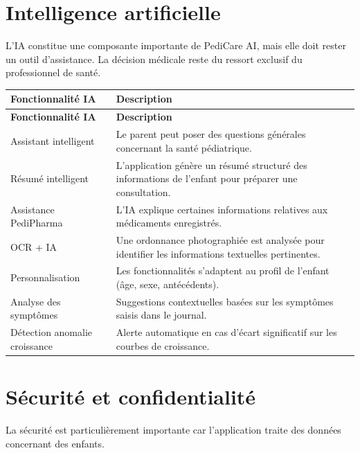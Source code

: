 \documentclass[11pt,a4paper]{article}
\newcommand{\headrow}{\rowcolor{navy}}
\newcommand{\tblhead}[1]{\color{white}\textbf{#1}}
\begin{document}
\section{Intelligence artificielle}

L'IA constitue une composante importante de PediCare AI, mais elle doit rester un outil d'assistance. La décision médicale reste du ressort exclusif du professionnel de santé.

\renewcommand{\arraystretch}{1.4}
\begin{longtable}{|p{4cm}|p{9cm}|}
\hline
\headrow \tblhead{Fonctionnalité IA} & \tblhead{Description} \\
\hline
\endfirsthead
\hline
\headrow \tblhead{Fonctionnalité IA} & \tblhead{Description} \\
\hline
\endhead
Assistant intelligent & Le parent peut poser des questions générales concernant la santé pédiatrique. \\
\hline
\rowcolor{rowgrey}
Résumé intelligent & L'application génère un résumé structuré des informations de l'enfant pour préparer une consultation. \\
\hline
Assistance PediPharma & L'IA explique certaines informations relatives aux médicaments enregistrés. \\
\hline
\rowcolor{rowgrey}
OCR + IA & Une ordonnance photographiée est analysée pour identifier les informations textuelles pertinentes. \\
\hline
Personnalisation & Les fonctionnalités s'adaptent au profil de l'enfant (âge, sexe, antécédents). \\
\hline
\rowcolor{rowgrey}
Analyse des symptômes & Suggestions contextuelles basées sur les symptômes saisis dans le journal. \\
\hline
Détection anomalie croissance & Alerte automatique en cas d'écart significatif sur les courbes de croissance. \\
\hline
\end{longtable}

\section{Sécurité et confidentialité}

La sécurité est particulièrement importante car l'application traite des données concernant des enfants.
\end{document}
